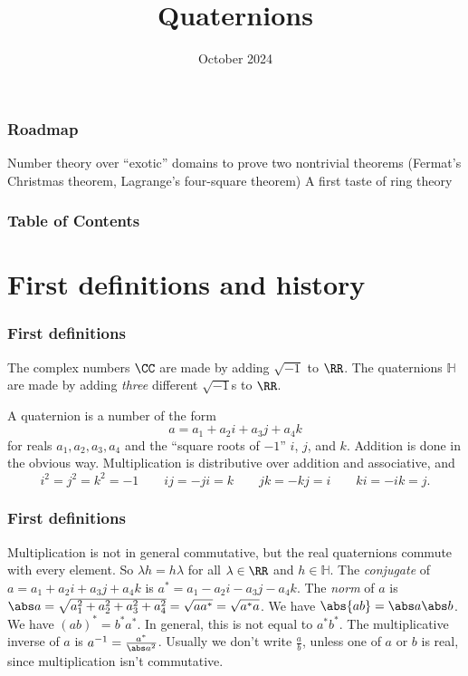 \documentclass{beamer}
\title{Quaternions}
\date{October 2024}
\newcommand{\HH}{\mathbb H}
\begin{document}
\frame{\titlepage}

\begin{frame}
	\frametitle{Roadmap}
	\begin{itemize}
		\ii Number theory over ``exotic'' domains to prove two nontrivial theorems (Fermat's Christmas theorem, Lagrange's four-square theorem)
		\ii A first taste of ring theory
	\end{itemize}
\end{frame}

\begin{frame}
	\frametitle{Table of Contents}
	\tableofcontents
\end{frame}

\section{First definitions and history}

\begin{frame}
	\frametitle{First definitions}
	\begin{itemize}
		\ii The complex numbers $\CC$ are made by adding $\sqrt{-1}$ to $\RR$.
		\ii The quaternions $\HH$ are made by adding \emph{three} different $\sqrt{-1}$s to $\RR$.
	\end{itemize}
	
	\begin{definition}
		A quaternion is a number of the form
		\[a = a_1 + a_2i + a_3j + a_4k\]
		for reals $a_1,a_2,a_3,a_4$ and the ``square roots of $-1$'' $i$, $j$, and $k$. Addition is done in the obvious way. Multiplication is distributive over addition and associative, and
		\[i^2 = j^2 = k^2 = -1 \qquad ij = -ji = k \qquad jk = -kj = i \qquad ki = -ik = j.\]
	\end{definition}
\end{frame}

\begin{frame}
	\frametitle{First definitions}
	\begin{itemize}
		\ii \alert{Multiplication is not in general commutative}, but the real quaternions commute with every element. So $\lambda h = h\lambda$ for all $\lambda \in \RR$ and $h \in \HH$.
		\ii The \emph{conjugate} of $a = a_1 + a_2i + a_3j + a_4k$ is $a^* = a_1 - a_2i - a_3j - a_4k$.
		\ii The \emph{norm} of $a$ is $\abs a = \sqrt{a_1^2 + a_2^2 + a_3^2 + a_4^2} = \sqrt{aa^*} = \sqrt{a^*a}$.
		\ii We have $\abs{ab} = \abs a \abs b$.
		\ii We have $(ab)^* = b^*a^*$. In general, this is not equal to $a^*b^*$.
		\ii The multiplicative inverse of $a$ is $a^{-1} = \frac{a^*}{\abs a^2}$.
		\ii Usually we don't write $\frac ab$, unless one of $a$ or $b$ is real, since multiplication isn't commutative.
	\end{itemize}
\end{frame}
\end{document}
